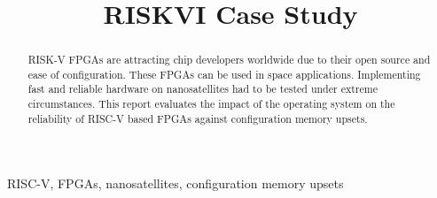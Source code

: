\documentclass[conference]{IEEEtran}
\begin{document}
\title{RISKVI Case Study\\}
\author{
}
\maketitle

\begin{abstract}
RISK-V FPGAs are attracting chip developers worldwide due to their open source and 
ease of configuration. These FPGAs can be used in space applications. Implementing fast and reliable 
hardware on nanosatellites had to be tested under extreme circumstances. This report evaluates the
impact of the operating system on the reliability of RISC-V based FPGAs against configuration
memory upsets. 
\end{abstract}
\begin{IEEEkeywords}
RISC-V, FPGAs, nanosatellites, configuration memory upsets
\end{IEEEkeywords}

\end{document}
